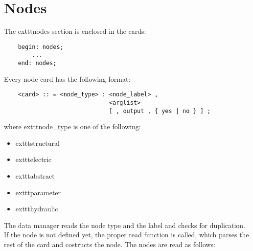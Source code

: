 \chapter{Nodes}
The 	exttt{nodes} section is enclosed in the cards:
\begin{verbatim}
    begin: nodes;
        ...
    end: nodes;
\end{verbatim}
Every node card has the following format:
\begin{verbatim}
    <card> :: = <node_type> : <node_label> ,
                              <arglist>
                              [ , output , { yes | no } ] ;
\end{verbatim}
where 	exttt{node\_type} is one of the following:
\begin{itemize}
    \item 	exttt{structural}
    \item 	exttt{electric}
    \item 	exttt{abstract}
    \item 	exttt{parameter}
    \item 	exttt{hydraulic}
\end{itemize}
The data manager reads the node type and the label and checks for
duplication. If the node is not defined yet, the proper read function is
called, which parses the rest of the card and costructs the node.
The nodes are read as follows:




